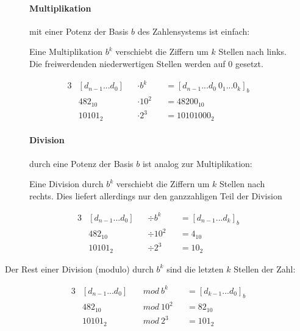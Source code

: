 \documentclass[12pt]{report}
\begin{document}
\begin{figure}[H]
  \begin{minipage}[t]{0.45\textwidth}
    \paragraph{Multiplikation} mit einer Potenz der Basis $b$ des Zahlensystems ist einfach:
    
    Eine Multiplikation $b^k$ verschiebt die Ziffern um $k$ Stellen nach links.
    Die freiwerdenden niederwertigen Stellen werden auf $0$ gesetzt.
    
    \begin{alignat*}{3}
       & [d_{n-1}...d_0] &  & \cdot b^k  &  & = [d_{n-1}...d_0\ 0_1 ... 0_k]_b \\
       & 482_{10}        &  & \cdot 10^2 &  & = 48200_{10}                     \\
       & 10101_2         &  & \cdot 2^3  &  & = 10101000_2
    \end{alignat*}
  \end{minipage}
  \hfill
  \begin{minipage}[t]{0.45\textwidth}
    \paragraph{Division} durch eine Potenz der Basis $b$ ist analog zur Multiplikation:
    
    Eine Division durch $b^k$ verschiebt die Ziffern um $k$ Stellen nach rechts.
    Dies liefert allerdings nur den ganzzahligen Teil der Division
    
    \begin{alignat*}{3}
       & [d_{n-1}...d_0] &  & \div b^k  &  & = [d_{n-1}...d_k]_b \\
       & 482_{10}        &  & \div 10^2 &  & = 4_{10}            \\
       & 10101_2         &  & \div 2^3  &  & = 10_2
    \end{alignat*}
  \end{minipage}
\end{figure}


Der Rest einer Division (modulo) durch $b^k$ sind die letzten $k$ Stellen der Zahl:

\begin{alignat*}{3}
   & [d_{n-1}...d_0] &  & \ mod\ b^k  &  & = [d_{k-1}...d_0]_b \\
   & 482_{10}        &  & \ mod\ 10^2 &  & = 82_{10}           \\
   & 10101_2         &  & \ mod\ 2^3  &  & = 101_2
\end{alignat*}
\end{document}
